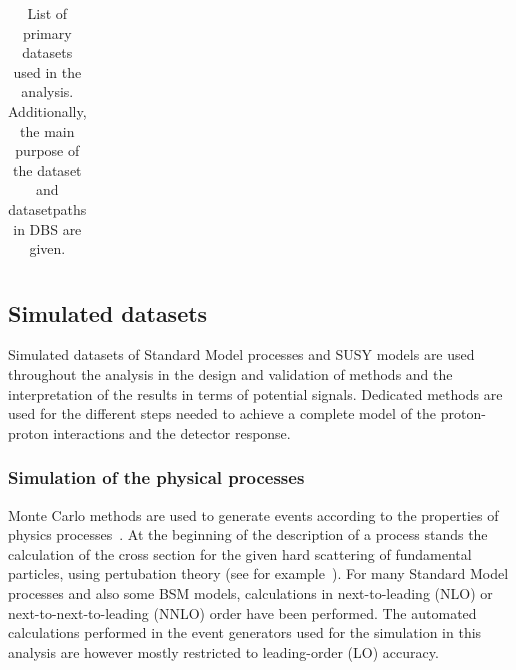 \begin{table}
\begin{center}
\begin{tabular}{c|c|c}
\end{tabular}


\caption{List of primary datasets used in the analysis. Additionally, the main purpose of the dataset and datasetpaths in DBS are given.}
\label{tab:datasets}
\end{center}
\end{table}



\subsection{Simulated datasets}
Simulated datasets of Standard Model processes and SUSY models are used throughout the analysis in the design and validation of methods and the interpretation of the results in terms of potential signals. Dedicated methods are used for the different steps needed to achieve a complete model of the proton-proton interactions and the detector response. 
\subsubsection{Simulation of the physical processes}
\label{sec:MCGen}
Monte Carlo methods are used to generate events according to the properties of physics processes~\cite{PDG}.
At the beginning of the description of a process stands the calculation of the cross section for the given hard scattering of fundamental particles, using pertubation theory (see for example~\cite{HalzenMartin}). For many Standard Model processes and also some BSM models, calculations in next-to-leading (NLO) or next-to-next-to-leading (NNLO) order have been performed. The automated calculations performed in the event generators used for the simulation in this analysis are however mostly restricted to leading-order (LO) accuracy. 

